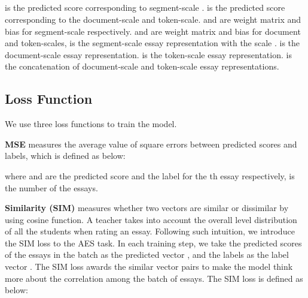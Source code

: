 \documentclass[11pt]{article}
\begin{document}
\begin{center}
\label{eq:pred_score}
  \\
\label{eq:pred_score_seg}
 \\
\label{eq:pred_score_doc_tok}
 \\
\label{eq:pred_score_doc_tok}
\\
\end{center}


 is the predicted score corresponding to segment-scale .
 is the predicted score corresponding to the document-scale and token-scale.
 and  are weight matrix and bias for segment-scale respectively.
 and  are weight matrix and bias for document and token-scales,  is the segment-scale essay representation with the scale .
 is the document-scale essay representation.
 is the token-scale essay representation.
 is the concatenation of document-scale and token-scale essay representations.

\subsection{Loss Function}
We use three loss functions to train the model. 

\textbf{MSE} measures the average value of square errors between predicted scores and labels, which is defined as below:

\begin{center}
\label{eq:mse}

\end{center}

where  and  are the predicted score and the label for the th essay respectively,  is the number of the essays.
 
\textbf{Similarity (SIM)} measures whether two vectors are similar or dissimilar by using cosine function.
A teacher takes into account the overall level distribution of all the students when rating an essay.
Following such intuition, we introduce the SIM loss to the AES task.
In each training step, we take the predicted scores of the essays in the batch as the predicted vector , and the labels as the label vector .
The SIM loss awards the similar vector pairs to make the model think more about the correlation among the batch of essays.
The SIM loss is defined as below:

\begin{center}
\label{eq:sim}
\\
 \\
 \\
\end{center}
\end{document}

